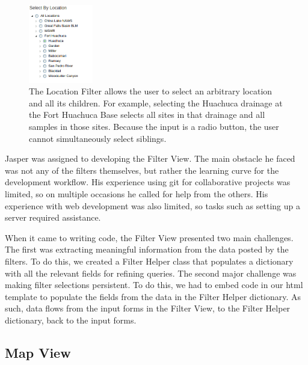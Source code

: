 \documentclass[10pt,draftclsnofoot,onecolumn]{IEEEtran}
\begin{document}
\begin{figure}[h]
\centering
\includegraphics[width=0.25\textwidth]{images/location_filter.png}
\captionsetup{justification=centering}
\caption{
  The Location Filter allows the user to select an arbitrary location and all its children.
  For example, selecting the Huachuca drainage at the Fort Huachuca Base selects all sites in that drainage and all samples in those sites.
  Because the input is a radio button, the user cannot simultaneously select siblings.
}
\label{fig:location_filter}
\end{figure}

Jasper was assigned to developing the Filter View.
The main obstacle he faced was not any of the filters themselves, but rather the learning curve for the development workflow.
His experience using git for collaborative projects was limited, so on multiple occasions he called for help from the others.
His experience with web development was also limited, so tasks such as setting up a server required assistance.

When it came to writing code, the Filter View presented two main challenges.
The first was extracting meaningful information from the data posted by the filters.
To do this, we created a Filter Helper class that populates a dictionary with all the relevant fields for refining queries.
The second major challenge was making filter selections persistent.
To do this, we had to embed code in our html template to populate the fields from the data in the Filter Helper dictionary.
As such, data flows from the input forms in the Filter View, to the Filter Helper dictionary, back to the input forms.

\subsection{Map View} %
\end{document}
